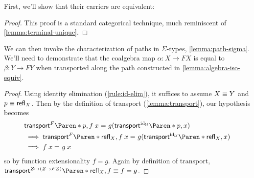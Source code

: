 \documentclass[12pt,twoside,draft]{reedthesis}
\newcommand{\TODO}[1]{\marginpar{\footnotesize\color{TODO}todo: #1}}
\begin{document}
First, we'll show that their carriers are equivalent:

\begin{proof}
  This proof is a standard categorical technique, much reminiscent of
  \cref{lemma:terminal-unique}.
	\TODO{proof}
\end{proof}

We can then invoke the characterization of paths in $\Sigma$-types,
\cref{lemma:path-sigma}. We'll need to demonstrate that the coalgebra map
$\alpha:X\to FX$ is equal to $\beta:Y\to FY$ when transported along the path
constructed in \cref{lemma:algebra-iso-equiv}.

\begin{proof}
  Using identity elimination (\cref{rule:id-elim}), it suffices to assume
  $X\equiv Y$ and $p\equiv\mathsf{refl}_{X}$. Then by the definition of transport
  (\cref{lemma:transport}), our hypothesis becomes
  \begin{align*}
    &\propeq{}{
      \transport{F}{p}{\apply{f}{x}}
    }{
      g({\transport{\id_{\universe}}{p}{x}})
    } \\
    &\implies
    \propeq{}{
      \transport{F}{\refl{X}}{\apply{f}{x}}
    }{
      g({\transport{\id_{\universe}}{\refl{X}}{x}})
    } \\
    &\implies
    \propeq{}{\apply{f}{x}}{\apply{g}{x}}
  \end{align*}
  so by function extensionality $f=g$. Again by definition of transport,
  $\transport{Z\mapsto (Z\to FZ)}{\refl{X}}{f} \jdeq f=g$.
\end{proof}
\end{document}
